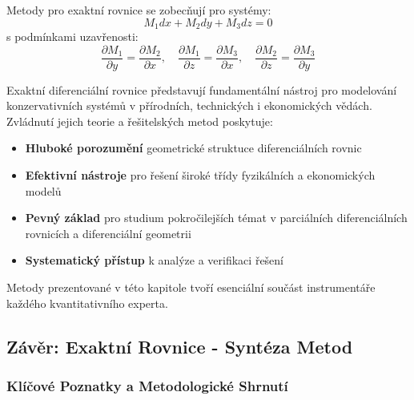 \vspace{0.6\baselineskip}

\begin{transition}
Metody pro exaktní rovnice se zobecňují pro systémy:
\[
M_1 dx + M_2 dy + M_3 dz = 0
\]
s podmínkami uzavřenosti:
\[
\frac{\partial M_1}{\partial y} = \frac{\partial M_2}{\partial x}, \quad
\frac{\partial M_1}{\partial z} = \frac{\partial M_3}{\partial x}, \quad
\frac{\partial M_2}{\partial z} = \frac{\partial M_3}{\partial y}
\]
\end{transition}

\vspace{0.8\baselineskip}

\begin{conclusion}
Exaktní diferenciální rovnice představují fundamentální nástroj pro modelování konzervativních systémů v přírodních, technických i ekonomických vědách. Zvládnutí jejich teorie a řešitelských metod poskytuje:
\begin{itemize}
\item \textbf{Hluboké porozumění} geometrické struktuce diferenciálních rovnic
\item \textbf{Efektivní nástroje} pro řešení široké třídy fyzikálních a ekonomických modelů
\item \textbf{Pevný základ} pro studium pokročilejších témat v parciálních diferenciálních rovnicích a diferenciální geometrii
\item \textbf{Systematický přístup} k analýze a verifikaci řešení
\end{itemize}

Metody prezentované v této kapitole tvoří esenciální součást instrumentáře každého kvantitativního experta.
\end{conclusion}

\subsection{Závěr: Exaktní Rovnice - Syntéza Metod}
\label{subsec:zaver-exaktni}

\subsubsection{Klíčové Poznatky a Metodologické Shrnutí}
\label{subsubsec:klicove-poznatky-exaktni}

